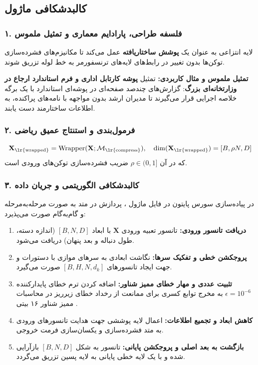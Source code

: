 \subsection{کالبدشکافی ماژول }

\subsubsection*{۱. فلسفه طراحی، پارادایم معماری و تمثیل ملموس}
لایه انتزاعی  به عنوان یک \textbf{پوشش ساختاریافته } عمل می‌کند تا مکانیزم‌های فشرده‌سازی توکن‌ها بدون تغییر در رابط‌های لایه‌های ترنسفورمر به خط لوله تزریق شوند.

\textbf{تمثیل ملموس و مثال کاربردی:}
تمثیل \textbf{پوشه کارتابل اداری و فرم استاندارد ارجاع در وزارتخانه‌ای بزرگ}: گزارش‌های چندصد صفحه‌ای در پوشه‌ای استاندارد با یک برگه خلاصه اجرایی قرار می‌گیرند تا مدیران ارشد بدون مواجهه با نامه‌های پراکنده، به اطلاعات ساختارمند دست یابند.

\subsubsection*{۲. فرمول‌بندی و استنتاج عمیق ریاضی }
\begin{equation}
\mathbf{X}_{\text{\lr{wrapped}}} = \operatorname{Wrapper}(\mathbf{X}; \mathcal{M}_{\text{\lr{compress}}}), \quad \dim(\mathbf{X}_{\text{\lr{wrapped}}}) = [B, \rho N, D]
\end{equation}
که در آن $\rho \in (0, 1]$ ضریب فشرده‌سازی توکن‌های ورودی است.

\subsubsection*{۳. کالبدشکافی الگوریتمی و جریان داده }
در پیاده‌سازی سورس پایتون در فایل ماژول ، پردازش در متد  به صورت مرحله‌به‌مرحله و گام‌به‌گام صورت می‌پذیرد:
\begin{enumerate}
\item \textbf{دریافت تانسور ورودی:} تانسور تعبیه ورودی $\mathbf{X}$ با ابعاد $[B, N, D]$ (اندازه دسته، طول دنباله و بعد پنهان) دریافت می‌شود.
\item \textbf{پروجکشن خطی و تفکیک سرها:} نگاشت ابعادی به سرهای موازی با دستورات  و  جهت ایجاد تانسورهای $[B, H, N, d_k]$ صورت می‌گیرد.
\item \textbf{تثبیت عددی و مهار خطای ممیز شناور:} اضافه کردن ترم خطای پایدارکننده $\epsilon = 10^{-6}$ به مخرج توابع کسری برای ممانعت از رخداد خطای زیرریز  در محاسبات ممیز شناور ۱۶ بیتی .
\item \textbf{کاهش ابعاد و تجمیع اطلاعات:} اعمال لایه پوششی جهت هدایت تانسورهای ورودی به متد فشرده‌سازی و یکسان‌سازی فرمت خروجی.
\item \textbf{بازگشت به بعد اصلی و پروجکشن پایانی:} تانسور به شکل $[B, N, D]$ بازآرایی شده و با یک لایه خطی پایانی به لایه پسین تزریق می‌گردد.
\end{enumerate}

